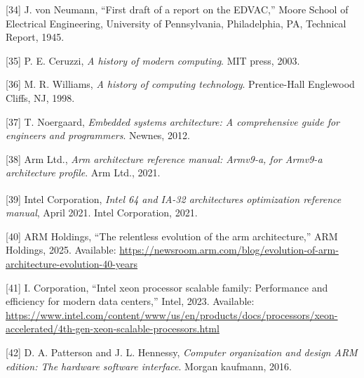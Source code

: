 \documentclass[12pt,oneside]{templates/unerthesis}
\newcommand{\CSLLeftMargin}[1]{#1} %
\newcommand{\CSLRightInline}[1]{#1} %
\newlength{\cslhangindent}
\newenvironment{CSLReferences}[2] %
 {\setlength{\parindent}{0pt}%
  \setlength{\leftskip}{#1 pt\relax}%
  \setlength{\parskip}{#2 pt\relax}%
  \everypar{\setlength{\hangindent}{\cslhangindent}}}
 {\par}
\begin{document}
\begin{CSLReferences}{0}{0}
\leavevmode{}%
\CSLLeftMargin{{[}34{]} }%
\CSLRightInline{J. von Neumann, {``First draft of a report on the {EDVAC},''} Moore School of Electrical Engineering, University of Pennsylvania, Philadelphia, PA, Technical Report, 1945.}

\leavevmode{}%
\CSLLeftMargin{{[}35{]} }%
\CSLRightInline{P. E. Ceruzzi, \emph{A history of modern computing}. MIT press, 2003.}

\leavevmode{}%
\CSLLeftMargin{{[}36{]} }%
\CSLRightInline{M. R. Williams, \emph{A history of computing technology}. Prentice-Hall Englewood Cliffs, NJ, 1998.}

\leavevmode{}%
\CSLLeftMargin{{[}37{]} }%
\CSLRightInline{T. Noergaard, \emph{Embedded systems architecture: A comprehensive guide for engineers and programmers}. Newnes, 2012.}

\leavevmode{}%
\CSLLeftMargin{{[}38{]} }%
\CSLRightInline{Arm Ltd., \emph{Arm architecture reference manual: Armv9-a, for Armv9-a architecture profile}. Arm Ltd., 2021.}

\leavevmode{}%
\CSLLeftMargin{{[}39{]} }%
\CSLRightInline{Intel Corporation, \emph{Intel\textsuperscript{\textregistered} 64 and IA-32 architectures optimization reference manual}, April 2021. Intel Corporation, 2021.}

\leavevmode{}%
\CSLLeftMargin{{[}40{]} }%
\CSLRightInline{ARM Holdings, {``The relentless evolution of the arm architecture,''} ARM Holdings, 2025. Available: \url{https://newsroom.arm.com/blog/evolution-of-arm-architecture-evolution-40-years}}

\leavevmode{}%
\CSLLeftMargin{{[}41{]} }%
\CSLRightInline{I. Corporation, {``Intel xeon processor scalable family: Performance and efficiency for modern data centers,''} Intel, 2023. Available: \url{https://www.intel.com/content/www/us/en/products/docs/processors/xeon-accelerated/4th-gen-xeon-scalable-processors.html}}

\leavevmode{}%
\CSLLeftMargin{{[}42{]} }%
\CSLRightInline{D. A. Patterson and J. L. Hennessy, \emph{Computer organization and design ARM edition: The hardware software interface}. Morgan kaufmann, 2016.}


\end{CSLReferences}
\end{document}
